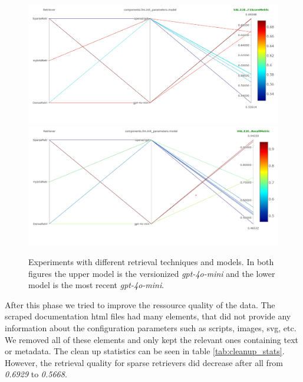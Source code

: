\begin{figure}[!ht]
    \centering
    \includegraphics[width=\textwidth]{images/RetrievalTypes-vs-LLM-f1.png}\\[6pt]
    \includegraphics[width=\textwidth]{images/RetrievalTypes-vs-LLM-Recall.png}
    \caption{Experiments with different retrieval techniques and models. In both figures the upper model is the versionized \textit{gpt-4o-mini} and the lower model is the most recent \textit{gpt-4o-mini}.}
    \label{fig:conf-phase-0-retrievers}
\end{figure}

After this phase we tried to improve the ressource quality of the data. The scraped documentation html files had many elements, that did not provide any information about the configuration parameters such as scripts, images, svg, etc. We removed all of these elements and only kept the relevant ones containing text or metadata. The clean up statistics can be seen in table \ref{tab:cleanup_stats}. However, the retrieval quality for sparse retrievers did decrease after all from \textit{0.6929} to \textit{0.5668}. 

